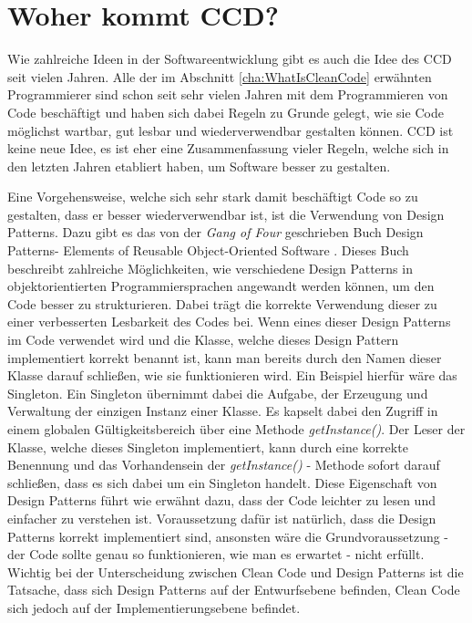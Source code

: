 \section{Woher kommt CCD?}
Wie zahlreiche Ideen in der Softwareentwicklung gibt es auch die Idee des CCD seit vielen Jahren. Alle der im Abschnitt \ref{cha:WhatIsCleanCode} erwähnten Programmierer sind schon seit sehr vielen Jahren mit dem Programmieren von Code beschäftigt und haben sich dabei Regeln zu Grunde gelegt, wie sie Code möglichst wartbar, gut lesbar und wiederverwendbar gestalten können. CCD ist keine neue Idee, es ist eher eine Zusammenfassung vieler Regeln, welche sich in den letzten Jahren etabliert haben, um Software besser zu gestalten.

\SuperPar Eine Vorgehensweise, welche sich sehr stark damit beschäftigt Code so zu gestalten, dass er besser wiederverwendbar ist, ist die Verwendung von Design Patterns. Dazu gibt es das von der \textit{Gang of Four} geschrieben Buch Design Patterns- Elements of Reusable Object-Oriented Software \cite{Gamma1995}. Dieses Buch beschreibt zahlreiche Möglichkeiten, wie verschiedene Design Patterns in objektorientierten Programmiersprachen angewandt werden können, um den Code besser zu strukturieren. Dabei trägt die korrekte Verwendung dieser zu einer verbesserten Lesbarkeit des Codes bei. Wenn eines dieser Design Patterns im Code verwendet wird und die Klasse, welche dieses Design Pattern implementiert korrekt benannt ist, kann man bereits durch den Namen dieser Klasse darauf schließen, wie sie funktionieren wird. Ein Beispiel hierfür wäre das Singleton. Ein Singleton übernimmt dabei die Aufgabe, der Erzeugung und Verwaltung der einzigen Instanz einer Klasse. Es kapselt dabei den Zugriff in einem globalen Gültigkeitsbereich über eine Methode \textit{getInstance()}. Der Leser der Klasse, welche dieses Singleton implementiert, kann durch eine korrekte Benennung und das Vorhandensein der \textit{getInstance()} - Methode sofort darauf schließen, dass es sich dabei um ein Singleton handelt. Diese Eigenschaft von Design Patterns führt wie erwähnt dazu, dass der Code leichter zu lesen und einfacher zu verstehen ist. Voraussetzung dafür ist natürlich, dass die Design Patterns korrekt implementiert sind, ansonsten wäre die Grundvoraussetzung - der Code sollte genau so funktionieren, wie man es erwartet - nicht erfüllt. Wichtig bei der Unterscheidung zwischen Clean Code und Design Patterns ist die Tatsache, dass sich Design Patterns auf der Entwurfsebene befinden, Clean Code sich jedoch auf der Implementierungsebene befindet.

